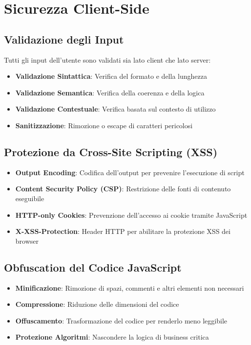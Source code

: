 \section{Sicurezza Client-Side}

\subsection{Validazione degli Input}
Tutti gli input dell'utente sono validati sia lato client che lato server:

\begin{itemize}
    \item \textbf{Validazione Sintattica}: Verifica del formato e della lunghezza
    \item \textbf{Validazione Semantica}: Verifica della coerenza e della logica
    \item \textbf{Validazione Contestuale}: Verifica basata sul contesto di utilizzo
    \item \textbf{Sanitizzazione}: Rimozione o escape di caratteri pericolosi
\end{itemize}

\subsection{Protezione da Cross-Site Scripting (XSS)}
\begin{itemize}
    \item \textbf{Output Encoding}: Codifica dell'output per prevenire l'esecuzione di script
    \item \textbf{Content Security Policy (CSP)}: Restrizione delle fonti di contenuto eseguibile
    \item \textbf{HTTP-only Cookies}: Prevenzione dell'accesso ai cookie tramite JavaScript
    \item \textbf{X-XSS-Protection}: Header HTTP per abilitare la protezione XSS dei browser
\end{itemize}

\subsection{Obfuscation del Codice JavaScript}
\begin{itemize}
    \item \textbf{Minificazione}: Rimozione di spazi, commenti e altri elementi non necessari
    \item \textbf{Compressione}: Riduzione delle dimensioni del codice
    \item \textbf{Offuscamento}: Trasformazione del codice per renderlo meno leggibile
    \item \textbf{Protezione Algoritmi}: Nascondere la logica di business critica
\end{itemize}

